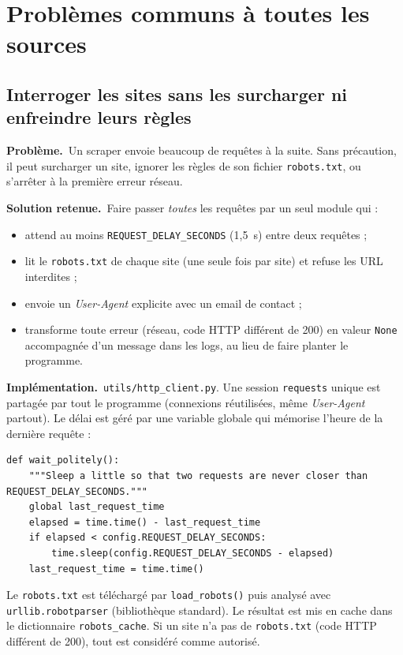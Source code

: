 \documentclass[11pt,a4paper]{article}
\newcommand{\pb}{\par\medskip\noindent\textbf{\textcolor{pbcolor}{Problème.}}\ }
\newcommand{\sol}{\par\medskip\noindent\textbf{\textcolor{solcolor}{Solution retenue.}}\ }
\newcommand{\impl}{\par\medskip\noindent\textbf{\textcolor{implcolor}{Implémentation.}}\ }
\newcommand{\code}[1]{\texttt{#1}}
\begin{document}
\section{Problèmes communs à toutes les sources}
\label{sec:transverse}

\subsection{Interroger les sites sans les surcharger ni enfreindre leurs règles}

\pb Un scraper envoie beaucoup de requêtes à la suite. Sans précaution, il peut surcharger
un site, ignorer les règles de son fichier \code{robots.txt}, ou s'arrêter à la première
erreur réseau.

\sol Faire passer \emph{toutes} les requêtes par un seul module qui :
\begin{itemize}
  \item attend au moins \code{REQUEST\_DELAY\_SECONDS} (1,5~s) entre deux requêtes ;
  \item lit le \code{robots.txt} de chaque site (une seule fois par site) et refuse les URL interdites ;
  \item envoie un \emph{User-Agent} explicite avec un email de contact ;
  \item transforme toute erreur (réseau, code HTTP différent de 200) en valeur \code{None}
        accompagnée d'un message dans les logs, au lieu de faire planter le programme.
\end{itemize}

\impl \code{utils/http\_client.py}. Une session \code{requests} unique est partagée par
tout le programme (connexions réutilisées, même \emph{User-Agent} partout). Le délai est
géré par une variable globale qui mémorise l'heure de la dernière requête :

\begin{lstlisting}
def wait_politely():
    """Sleep a little so that two requests are never closer than REQUEST_DELAY_SECONDS."""
    global last_request_time
    elapsed = time.time() - last_request_time
    if elapsed < config.REQUEST_DELAY_SECONDS:
        time.sleep(config.REQUEST_DELAY_SECONDS - elapsed)
    last_request_time = time.time()
\end{lstlisting}

Le \code{robots.txt} est téléchargé par \code{load\_robots()} puis analysé avec
\code{urllib.robotparser} (bibliothèque standard). Le résultat est mis en cache dans le
dictionnaire \code{robots\_cache}. Si un site n'a pas de \code{robots.txt} (code HTTP
différent de 200), tout est considéré comme autorisé.
\end{document}
